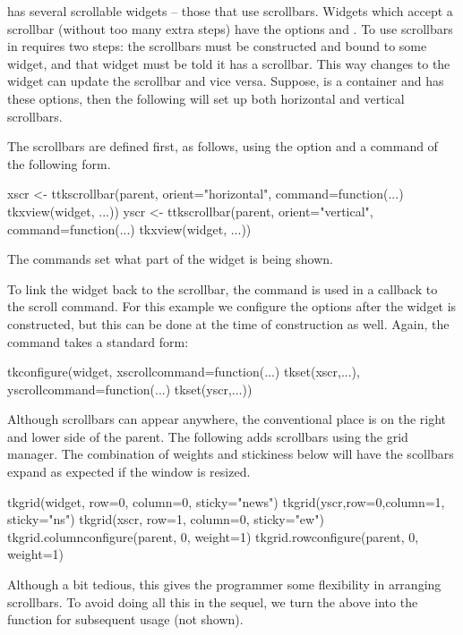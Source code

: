 \TK\/ has several scrollable widgets -- those that use scrollbars.
Widgets which accept a scrollbar (without too many extra steps) have
the options  and .  To use
scrollbars in  requires two steps: the scrollbars must be
constructed and bound to some widget, and that widget must be told it
has a scrollbar. This way changes to the widget can update the
scrollbar and vice versa. Suppose,  is a container and
 has these options, then the following will set up both
horizontal and vertical scrollbars.

The scrollbars are defined first, as follows, using the
 option and a command of the following
form.
\begin{Schunk}
\begin{Sinput}
 xscr <- ttkscrollbar(parent, orient="horizontal",
                      command=function(...) tkxview(widget, ...))
 yscr <- ttkscrollbar(parent, orient="vertical",
                      command=function(...) tkxview(widget, ...))
\end{Sinput}
\end{Schunk}
The  commands set what part of the widget is being shown.

To link the widget back to the scrollbar, the  command is
used in a callback to the scroll command.  For this example we
configure the options after the widget is constructed, but this can be
done at the time of construction as well. Again, the command takes a
standard form:
\begin{Schunk}
\begin{Sinput}
 tkconfigure(widget,
             xscrollcommand=function(...) tkset(xscr,...),
             yscrollcommand=function(...) tkset(yscr,...))
\end{Sinput}
\end{Schunk}

Although scrollbars can appear anywhere, the conventional place is on the right and lower side of the parent. The following adds scrollbars using the grid manager. The combination of weights and stickiness below will have the scollbars expand as expected if the window is resized. 
\begin{Schunk}
\begin{Sinput}
 tkgrid(widget, row=0, column=0, sticky="news")
 tkgrid(yscr,row=0,column=1, sticky="ns")
 tkgrid(xscr, row=1, column=0, sticky="ew")
 tkgrid.columnconfigure(parent, 0, weight=1)
 tkgrid.rowconfigure(parent, 0, weight=1)
\end{Sinput}
\end{Schunk}
%
Although a bit tedious, this gives the programmer some flexibility in
arranging scrollbars. To avoid doing all this in the sequel, we turn
the above into the function  for subsequent
usage (not shown).


